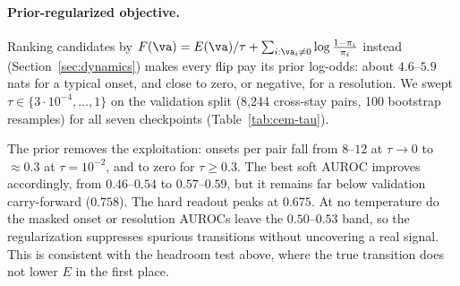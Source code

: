 \paragraph{Prior-regularized objective.} Ranking candidates by $F(\va)=E(\va)/\tau+\sum_{i:\va_i\ne0}\log\frac{1-\pi_i}{\pi_i}$ instead (Section~\ref{sec:dynamics}) makes every flip pay its prior log-odds: about $4.6$--$5.9$ nats for a typical onset, and close to zero, or negative, for a resolution. We swept $\tau\in\{3{\cdot}10^{-4},\dots,1\}$ on the validation split (8{,}244 cross-stay pairs, 100 bootstrap resamples) for all seven checkpoints (Table~\ref{tab:cem-tau}).

The prior removes the exploitation: onsets per pair fall from $8$--$12$ at $\tau\to0$ to $\approx0.3$ at $\tau=10^{-2}$, and to zero for $\tau\ge0.3$. The best soft AUROC improves accordingly, from $0.46$--$0.54$ to $0.57$--$0.59$, but it remains far below validation carry-forward ($0.758$). The hard readout peaks at $0.675$. At no temperature do the masked onset or resolution AUROCs leave the $0.50$--$0.53$ band, so the regularization suppresses spurious transitions without uncovering a real signal. This is consistent with the headroom test above, where the true transition does not lower $E$ in the first place.

